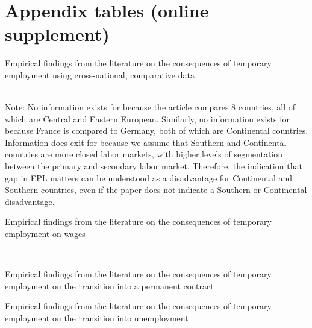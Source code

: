\section{Appendix tables (online supplement)}
\label{appendix_tables}

{\footnotesize %

}

\begin{table}[!h]
\caption{Empirical findings from the literature on the consequences of temporary employment using cross-national, comparative data}
    \resizebox{\textwidth}{!}{}
    \label{table_articles_comparative}
    \\
    \tiny
Note: No information exists for \citealp{babos_2014} because the article compares 8 countries, all of which are Central and Eastern European.  Similarly, no information exists for \citealp{gash_mcginnity_2007} because France is compared to Germany, both of which are Continental countries.  Information does exit for \citealp{passaretta_wolbers_2019} because we assume that Southern and Continental countries are more closed labor markets, with higher levels of segmentation between the primary and secondary labor market.  Therefore, the indication that gap in EPL matters can be understood as a disadvantage for Continental and Southern countries, even if the paper does not indicate a Southern or Continental disadvantage.
\end{table}


\begin{table}[!h]
\caption{Empirical findings from the literature on the consequences of temporary employment on wages}
    \resizebox{\textwidth}{!}{}
    \label{table_articles_wages}
    \\
\end{table}

\begin{table}[!h]
\caption{Empirical findings from the literature on the consequences of temporary employment on the transition into a permanent contract}
    \resizebox{\textwidth}{!}{}
    \label{table_articles_permanent}
\end{table}

\begin{table}[!h]
\caption{Empirical findings from the literature on the consequences of temporary employment on the transition into unemployment}
    \resizebox{\textwidth}{!}{}
    \label{table_articles_unemployment}
\end{table}

